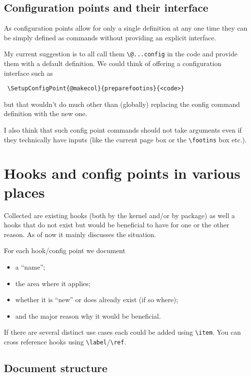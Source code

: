 \documentclass{article}
\newcounter{hook}
\newcounter{config}
\newcommand\cs[1]{\texttt{\textbackslash #1}}
\begin{document}
\subsection{Configuration points and their interface}

As configuration points allow for only a single definition at any one
time they can be simply defined as commands without providing an
explicit interface.

My current suggestion is to all call them \cs{@...config} in the
\LaTeXe{} code and provide them with a default definition. We could
think of offering a configuration interface such as
\begin{verbatim}
 \SetupConfigPoint{@makecol}{preparefootins}{<code>}
\end{verbatim}
but that wouldn't do much other than (globally) replacing the config
command definition with the new one.

I also think that such config point commands should not take arguments
even if they technically have inputs (like the current page box or the
\cs{footins} box etc.).


\section{Hooks and config points in various places}

Collected
are existing \LaTeXe{} hooks (both by the kernel and/or by package) as
well a hooks that do not exist but would be beneficial to have for one
or the other reason. As of now it mainly discusses the \LaTeXe{}
situation.

For each hook/config point we document
\begin{itemize}
\item a ``name'';
\item the area where it applies;
\item whether it is ``new'' or does already exist (if so where);
\item and the major reason why it would be beneficial.
\end{itemize}
If there are several distinct use cases each could be added using
\cs{item}. You can cross reference hooks using
\cs{label}/\cs{ref}.



\subsection{Document structure}
\end{document}
